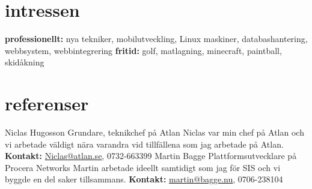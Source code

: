 \documentclass[]{friggeri-cv} %
\begin{document}

\section{intressen}

\textbf{professionellt:} nya tekniker, mobilutveckling, Linux maskiner, databashantering, webbsystem, webbintegrering \textbf{fritid:} golf, matlagning, minecraft, paintball, skidåkning


\section{referenser}
\begin{entrylist}
	\entry
	{}
	{Niclas Hugosson}
	{Grundare, teknikchef på Atlan}
	{Niclas var min chef på Atlan och vi arbetade väldigt nära varandra vid tillfällena som jag arbetade på Atlan. \textbf{Kontakt:} \href{mailto:niclas@atlan.se}{Niclas@atlan.se}, 0732-663399}
	\entry
	{}
	{Martin Bagge}
	{Plattformsutvecklare på Procera Networks}
	{Martin arbetade ideellt samtidigt som jag för SIS och vi byggde en del saker tillsammans. \textbf{Kontakt:} \href{mailto:martin@bagge.nu}{martin@bagge.nu}, 0706-238104 }
\end{entrylist}



\end{document}
